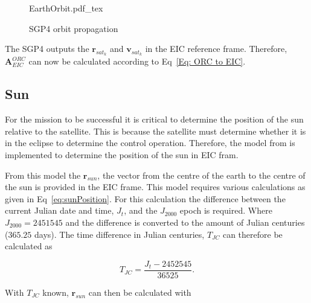 \begin{figure}[!htb]
	\centering
	\def\svgwidth{10cm}
	{EarthOrbit.pdf_tex}
	\label{fig:EarthOrbit}
	\caption{SGP4 orbit propagation}
\end{figure}


The SGP4 outputs the $\mathbf{r}_{sat_k}$ and $\mathbf{v}_{sat_k}$ in the EIC reference frame. Therefore, $\boldsymbol{A}^{ORC}_{EIC}$ can now be calculated according to Eq~\ref{Eq: ORC to EIC}.

\subsection{Sun}
For the mission to be successful it is critical to determine the position of the sun relative to the satellite. This is because the satellite must determine whether it is in the eclipse to determine the control operation. Therefore, the model from \cite{vallado2001fundamentals} is implemented to determine the position of the sun in EIC fram.

From this model the $\mathbf{r}_{sun}$, the vector from the centre of the earth to the centre of the sun is provided in the EIC frame. This model requires various calculations as given in Eq~\ref{eq:sunPosition}. For this calculation the difference between the current Julian date and time, $J_t$, and the $J_{2000}$ epoch is required. Where $J_{2000} = \num{2451545}$ and the difference is converted to the amount of Julian centuries ($\num{365.25}$ days). The time difference in Julian centuries, $T_{JC}$ can therefore be calculated as 

\begin{equation}
T_{JC} = \frac{J_t - \num{2452545}}{\num{36525}}.
\end{equation}

With $T_{JC}$ known, $\mathbf{r}_{sun}$ can then be calculated with

